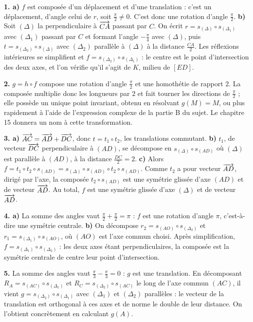 \begin{corrige}[annales]
\textbf{1. a)} $f$ est composée d'un déplacement et d'une translation : c'est
un déplacement, d'angle celui de $r$, soit $\frac{\pi}{2} \neq 0$. C'est donc
une rotation d'angle $\frac{\pi}{2}$.
\textbf{b)} Soit $(\Delta)$ la perpendiculaire à $\overrightarrow{CA}$ passant par $C$.
On écrit $r = s_{(\Delta)} \circ s_{(\Delta_{1})}$ avec $(\Delta_{1})$ passant
par $C$ et formant l'angle $-\frac{\pi}{4}$ avec $(\Delta)$, puis
$t = s_{(\Delta_{2})} \circ s_{(\Delta)}$ avec $(\Delta_{2})$ parallèle à
$(\Delta)$ à la distance $\frac{CA}{2}$. Les réflexions intérieures se
simplifient et $f = s_{(\Delta_{2})} \circ s_{(\Delta_{1})}$ : le centre est
le point d'intersection des deux axes, et l'on vérifie qu'il s'agit de $K$,
milieu de $[ED]$.

\textbf{2.} $g = h \circ f$ compose une rotation d'angle $\frac{\pi}{2}$ et
une homothétie de rapport $2$. La composée multiplie donc les longueurs par
$2$ et fait tourner les directions de $\frac{\pi}{2}$ ; elle possède un unique
point invariant, obtenu en résolvant $g(M) = M$, ou plus rapidement à l'aide
de l'expression complexe de la partie B du sujet. Le chapitre 15 donnera un
nom à cette transformation.

\textbf{3. a)} $\overrightarrow{AC} = \overrightarrow{AD}+\overrightarrow{DC}$, donc
$t = t_{1} \circ t_{2}$, les translations commutant.
\textbf{b)} $t_{1}$, de vecteur $\overrightarrow{DC}$ perpendiculaire à $(AD)$, se
décompose en $s_{(\Delta)} \circ s_{(AD)}$ où $(\Delta)$ est parallèle à
$(AD)$, à la distance $\frac{DC}{2} = 2$.
\textbf{c)} Alors
$f = t_{1} \circ t_{2} \circ s_{(AD)}
= s_{(\Delta)} \circ s_{(AD)} \circ t_{2} \circ s_{(AD)}$. Comme $t_{2}$ a
pour vecteur $\overrightarrow{AD}$, dirigé par l'axe, la composée
$t_{2} \circ s_{(AD)}$ est une symétrie glissée d'axe $(AD)$ et de vecteur
$\overrightarrow{AD}$. Au total, $f$ est une symétrie glissée d'axe $(\Delta)$ et de
vecteur $\overrightarrow{AD}$.

\textbf{4. a)} La somme des angles vaut $\frac{\pi}{2}+\frac{\pi}{2} = \pi$ :
$f$ est une rotation d'angle $\pi$, c'est-à-dire une symétrie centrale.
\textbf{b)} On décompose $r_{2} = s_{(AO)} \circ s_{(\Delta_{2})}$ et
$r_{1} = s_{(\Delta_{1})} \circ s_{(AO)}$, où $(AO)$ est l'axe commun choisi.
Après simplification, $f = s_{(\Delta_{1})} \circ s_{(\Delta_{2})}$ : les deux
axes étant perpendiculaires, la composée est la symétrie centrale de centre
leur point d'intersection.

\textbf{5.} La somme des angles vaut $\frac{\pi}{3}-\frac{\pi}{3} = 0$ : $g$
est une translation. En décomposant $R_{A} = s_{(AC)} \circ s_{(\Delta_{1})}$
et $R_{C} = s_{(\Delta_{2})} \circ s_{(AC)}$ le long de l'axe commun $(AC)$,
il vient $g = s_{(\Delta_{2})} \circ s_{(\Delta_{1})}$ avec
$(\Delta_{1})$ et $(\Delta_{2})$ parallèles : le vecteur de la translation est
orthogonal à ces axes et de norme le double de leur distance. On l'obtient
concrètement en calculant $g(A)$.


\end{corrige}
